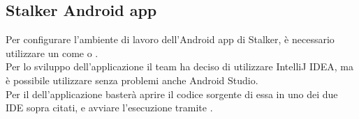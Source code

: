 \documentclass[../manuale-sviluppatore.tex]{subfiles}
\begin{document}
\subsection{Stalker Android app}

Per configurare l'ambiente di lavoro dell'Android app di Stalker, è necessario utilizzare un  come  o .\\
Per lo sviluppo dell'applicazione il team ha deciso di utilizzare IntelliJ IDEA, ma è possibile utilizzare senza problemi anche Android Studio.\\
Per il  dell'applicazione basterà aprire il codice sorgente di essa in uno dei due IDE sopra citati, e avviare l'esecuzione tramite . \\
\end{document}
